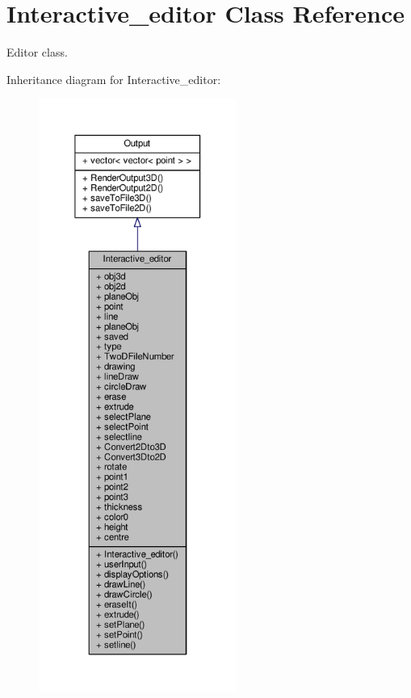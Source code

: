 \hypertarget{classInteractive__editor}{}\section{Interactive\+\_\+editor Class Reference}
\label{classInteractive__editor}


Editor class.  




Inheritance diagram for Interactive\+\_\+editor\+:\nopagebreak
\begin{figure}[H]
\begin{center}
\leavevmode
\includegraphics[height=550pt]{classInteractive__editor__inherit__graph}
\end{center}
\end{figure}


